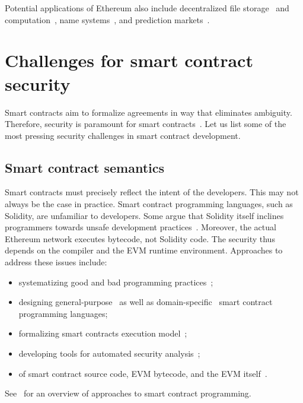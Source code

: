 Potential applications of Ethereum also include decentralized file storage~\cite{Storj} and computation~\cite{Golem}, name systems~\cite{ENS}, and prediction markets~\cite{Augur, Gnosis}.



\section{Challenges for smart contract security}

Smart contracts aim to formalize agreements in way that eliminates ambiguity.
Therefore, security is paramount for smart contracts~\cite{Atzei2017, Delmolino2016}.
Let us list some of the most pressing security challenges in smart contract development.

\subsection{Smart contract semantics}
Smart contracts must precisely reflect the intent of the developers.
This may not always be the case in practice.
Smart contract programming languages, such as Solidity, are unfamiliar to developers.
Some argue that Solidity itself inclines programmers towards unsafe development practices~\cite{ydtm2016}.
Moreover, the actual Ethereum network executes bytecode, not Solidity code.
The security thus depends on the compiler and the EVM runtime environment.
Approaches to address these issues include:
\begin{itemize}
	\item systematizing good and bad programming practices~\cite{ConsenSys16, Chen2017};
	\item designing general-purpose~\cite{Hirai2017a, Buterin2017b, Pettersson2016} as well as domain-specific~\cite{Biryukov2017, EgelundMueller2017} smart contract programming languages;
	\item formalizing smart contracts execution model~\cite{Sergey2017};
	\item developing tools for automated security analysis~\cite{Luu2016a, Tsankov2018};
	\item of smart contract source code, EVM bytecode, and the EVM itself~\cite{Bhargavan2016, Hirai2017}.
\end{itemize}

See~\cite{Seijas2016} for an overview of approaches to smart contract programming.

